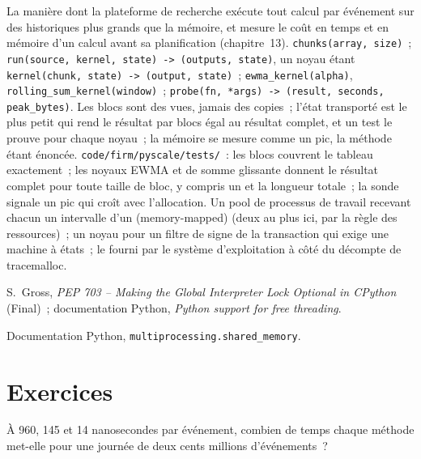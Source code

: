\begin{build}
 La manière dont la plateforme de recherche exécute tout calcul par événement sur des historiques plus grands que la mémoire, et mesure le coût
en temps et en mémoire d'un calcul avant sa planification (chapitre~13).
 \texttt{chunks(array, size)}~; \texttt{run(source, kernel, state) -> (outputs, state)}, un noyau étant
\texttt{kernel(chunk, state) -> (output, state)}~; \texttt{ewma\_kernel(alpha)}, \texttt{rolling\_sum\_kernel(window)}~;
\texttt{probe(fn, *args) -> (result, seconds, peak\_bytes)}.
 Les blocs sont des vues, jamais des copies~; l'état transporté est le plus petit qui rend le résultat par blocs égal au
résultat complet, et un test le prouve pour chaque noyau~; la mémoire se mesure comme un pic, la méthode étant énoncée.
 \texttt{code/firm/pyscale/tests/}~: les blocs couvrent le tableau exactement~; les noyaux EWMA et de somme glissante donnent le
résultat complet pour toute taille de bloc, y compris un et la longueur totale~; la sonde signale un pic qui croît avec l'allocation.
 Un pool de processus de travail recevant chacun un intervalle d'un  (memory-mapped) (deux au plus ici, par la règle des ressources)~; un noyau
pour un filtre de signe de la transaction qui exige une machine à états~; le  fourni par le système d'exploitation à côté du décompte de tracemalloc.
\end{build}

\begin{omsources}
\item S.~Gross, \emph{PEP 703 -- Making the Global Interpreter Lock Optional in CPython} (Final)~; documentation Python,
\emph{Python support for free threading}.
\item Documentation Python, \texttt{multiprocessing.shared\_memory}.
\end{omsources}

\section{Exercices}

\begin{exercise}[$\star$]\label{exo:pl:python-at-scale:1}
À 960, 145 et 14 nanosecondes par événement, combien de temps chaque méthode met-elle pour une journée de deux cents millions d'événements~?
\end{exercise}

